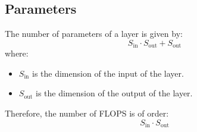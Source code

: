 \subsection{Parameters}

The number of parameters of a layer is given by:
\[ S_\text{in} \cdot S_\text{out} + S_\text{out} \]
where:
\begin{itemize}
    \item $S_\text{in}$ is the dimension of the input of the layer.
    \item $S_\text{out}$ is the dimension of the output of the layer.
\end{itemize}

Therefore, the number of FLOPS is of order:
\[ S_\text{in} \cdot S_\text{out} \]
